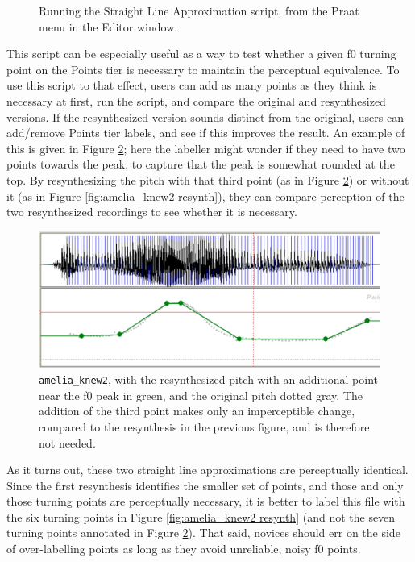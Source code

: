 \documentclass[11pt, twoside]{memoir}
\begin{document}
{{\begin{figure}[H]
\caption{Running the Straight Line Approximation script, from the Praat menu in the Editor window.
\label{fig:amelia_knew2 SLA menu}
}
\end{figure}
This script can be especially useful as a way to test whether a given f0 turning point on the Points tier is necessary to maintain the perceptual equivalence. To use this script to that effect, users can add as many points as they think is necessary at first, run the script, and compare the original and resynthesized versions. If the resynthesized version sounds distinct from the original, users can add\slash remove Points tier labels, and see if this improves the result. An example of this is given in Figure \ref{fig:amelia_knew2 resynth extra}; here the labeller might wonder if they need to have two points towards the peak, to capture that the peak is somewhat rounded at the top. By resynthesizing the pitch with that third point (as in Figure \ref{fig:amelia_knew2 resynth extra}) or without it (as in Figure \ref{fig:amelia_knew2 resynth}), they can compare perception of the two resynthesized recordings to see whether it is necessary.
\begin{figure}[H]
\centering
\includegraphics[width=.875\linewidth]{Points-amelia_knew2-resynth-extra.png}
\caption[\texttt{amelia\_knew2}, with the resynthesized pitch with an additional point.]{\texttt{amelia\_knew2}, with the resynthesized pitch with an additional point near the f0 peak in green, and the original pitch dotted gray. The addition of the third point makes only an imperceptible change, compared to the resynthesis in the previous figure, and is therefore not needed.
\label{fig:amelia_knew2 resynth extra}
}
\end{figure}
As it turns out, these two straight line approximations are perceptually identical. Since the first resynthesis identifies the smaller set of points, and those and only those turning points are perceptually necessary, it is better to label this file with the six turning points in Figure \ref{fig:amelia_knew2 resynth} (and not the seven turning points annotated in Figure \ref{fig:amelia_knew2 resynth extra}). That said, novices should err on the side of over-labelling points as long as they avoid unreliable, noisy f0 points.
}}
\end{document}
